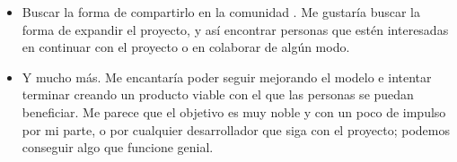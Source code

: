 \begin{itemize}
  \item Buscar la forma de compartirlo en la comunidad . Me gustaría buscar la forma de expandir el proyecto, y así encontrar personas que estén interesadas en continuar con el proyecto o en colaborar de algún modo.

  \item Y mucho más. Me encantaría poder seguir mejorando el modelo e intentar terminar creando un producto viable con el que las personas se puedan beneficiar. Me parece que el objetivo es muy noble y con un poco de impulso por mi parte, o por cualquier desarrollador que siga con el proyecto; podemos conseguir algo que funcione genial.

\end{itemize}

